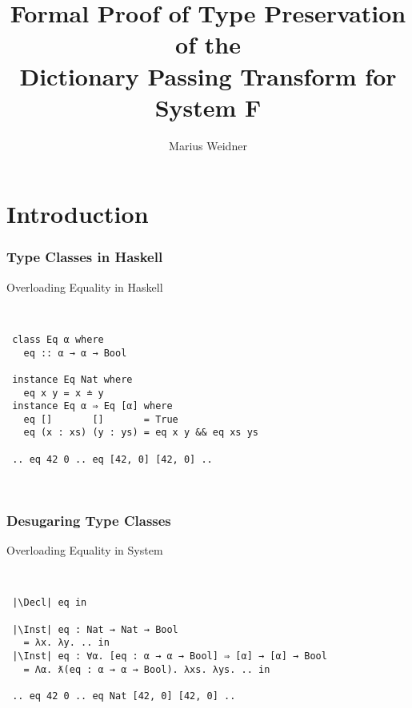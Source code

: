 \documentclass{beamer}
\title[Formal Dictionary Passing Transform]{Formal Proof of Type Preservation of the\\Dictionary Passing Transform for System F}
\institute[Uni Freiburg]{Chair of Programming Languages, University of Freiburg}
\author{Marius Weidner}
\begin{document}





\begin{frame}
  \titlepage
\end{frame}

\section{Introduction}

\begin{frame}[fragile]
  \frametitle{Type Classes in Haskell}
  \begin{block}{Overloading Equality in Haskell}
    \begin{center}
      ~
      \begin{verbatim}
 class Eq α where
   eq :: α → α → Bool
 
 instance Eq Nat where
   eq x y = x ≐ y
 instance Eq α ⇒ Eq [α] where
   eq []       []       = True
   eq (x : xs) (y : ys) = eq x y && eq xs ys 
     
 .. eq 42 0 .. eq [42, 0] [42, 0] ..
      \end{verbatim}
      ~
    \end{center}
  \end{block}
\end{frame}

\begin{frame}[fragile]
  \frametitle{Desugaring Type Classes}
  \begin{block}{Overloading Equality in System \Fo}
    \begin{center}
      ~
      \begin{verbatim}
 |\Decl| eq in

 |\Inst| eq : Nat → Nat → Bool 
   = λx. λy. .. in
 |\Inst| eq : ∀α. [eq : α → α → Bool] ⇒ [α] → [α] → Bool 
   = Λα. ƛ(eq : α → α → Bool). λxs. λys. .. in
    
 .. eq 42 0 .. eq Nat [42, 0] [42, 0] .. 
      \end{verbatim}
      ~
    \end{center}
  \end{block}
\end{frame}
\end{document}
